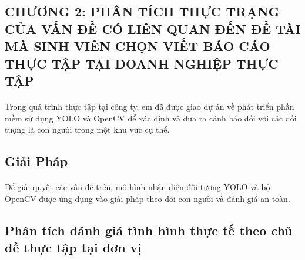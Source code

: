 	\pagestyle{fancy}
	\fancyhf{}
	\fancyfoot[R]{\thepage}
\begin{flushleft}
    \fontsize{16}{20}\selectfont
    \section*{CHƯƠNG 2: PHÂN TÍCH THỰC TRẠNG CỦA VẤN ĐỀ CÓ LIÊN QUAN ĐẾN
    ĐỀ TÀI MÀ SINH VIÊN CHỌN VIẾT BÁO CÁO THỰC TẬP TẠI DOANH NGHIỆP THỰC TẬP}
    \fontsize{13}{20}\selectfont
    \paragraph{}
    \fontsize{13}{20}\selectfont Trong quá trình thực tập tại công ty, em đã được giao dự án về phát triển phần mềm sử dụng YOLO và OpenCV để xác định và đưa ra cảnh báo đối với các đối tượng là con người trong một khu vực cụ thể.\\
    \setcounter{section}{2}
    \setcounter{subsection}{0}
    
    \subsection{Giải Pháp}
    \fontsize{13}{13}\selectfont\paragraph{}
    Để giải quyết các vấn đề trên, mô hình nhận diện đối tượng YOLO và bộ OpenCV được úng dụng vào giải pháp theo dõi con người và đánh giá an toàn. \\
    
    \subsection{Phân tích đánh giá tình hình thực tế theo chủ đề thực tập tại đơn vị}

\end{flushleft}
